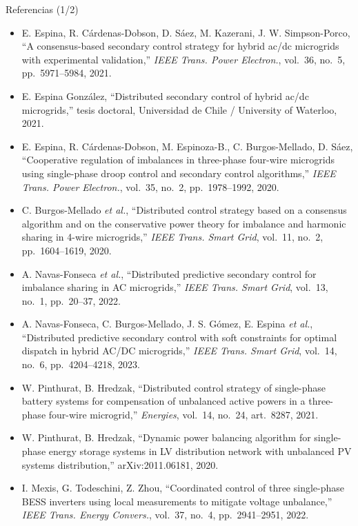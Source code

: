 \documentclass[aspectratio=169,10pt,t]{beamer}
\begin{document}
\begin{frame}{Referencias (1/2)}
  \fontsize{6.6}{7.9}\selectfont
  \begin{itemize}\setlength\itemsep{1pt}
    \item[{[1]}] E. Espina, R. Cárdenas-Dobson, D. Sáez, M. Kazerani, J. W. Simpson-Porco, ``A consensus-based secondary control strategy for hybrid ac/dc microgrids with experimental validation,'' \emph{IEEE Trans. Power Electron.}, vol.~36, no.~5, pp.~5971--5984, 2021.
    \item[{[2]}] E. Espina González, ``Distributed secondary control of hybrid ac/dc microgrids,'' tesis doctoral, Universidad de Chile / University of Waterloo, 2021.
    \item[{[3]}] E. Espina, R. Cárdenas-Dobson, M. Espinoza-B., C. Burgos-Mellado, D. Sáez, ``Cooperative regulation of imbalances in three-phase four-wire microgrids using single-phase droop control and secondary control algorithms,'' \emph{IEEE Trans. Power Electron.}, vol.~35, no.~2, pp.~1978--1992, 2020.
    \item[{[4]}] C. Burgos-Mellado \emph{et al.}, ``Distributed control strategy based on a consensus algorithm and on the conservative power theory for imbalance and harmonic sharing in 4-wire microgrids,'' \emph{IEEE Trans. Smart Grid}, vol.~11, no.~2, pp.~1604--1619, 2020.
    \item[{[5]}] A. Navas-Fonseca \emph{et al.}, ``Distributed predictive secondary control for imbalance sharing in AC microgrids,'' \emph{IEEE Trans. Smart Grid}, vol.~13, no.~1, pp.~20--37, 2022.
    \item[{[6]}] A. Navas-Fonseca, C. Burgos-Mellado, J. S. Gómez, E. Espina \emph{et al.}, ``Distributed predictive secondary control with soft constraints for optimal dispatch in hybrid AC/DC microgrids,'' \emph{IEEE Trans. Smart Grid}, vol.~14, no.~6, pp.~4204--4218, 2023.
    \item[{[7]}] W. Pinthurat, B. Hredzak, ``Distributed control strategy of single-phase battery systems for compensation of unbalanced active powers in a three-phase four-wire microgrid,'' \emph{Energies}, vol.~14, no.~24, art.~8287, 2021.
    \item[{[8]}] W. Pinthurat, B. Hredzak, ``Dynamic power balancing algorithm for single-phase energy storage systems in LV distribution network with unbalanced PV systems distribution,'' arXiv:2011.06181, 2020.
    \item[{[9]}] I. Mexis, G. Todeschini, Z. Zhou, ``Coordinated control of three single-phase BESS inverters using local measurements to mitigate voltage unbalance,'' \emph{IEEE Trans. Energy Convers.}, vol.~37, no.~4, pp.~2941--2951, 2022.
  \end{itemize}
\end{frame}
\end{document}
